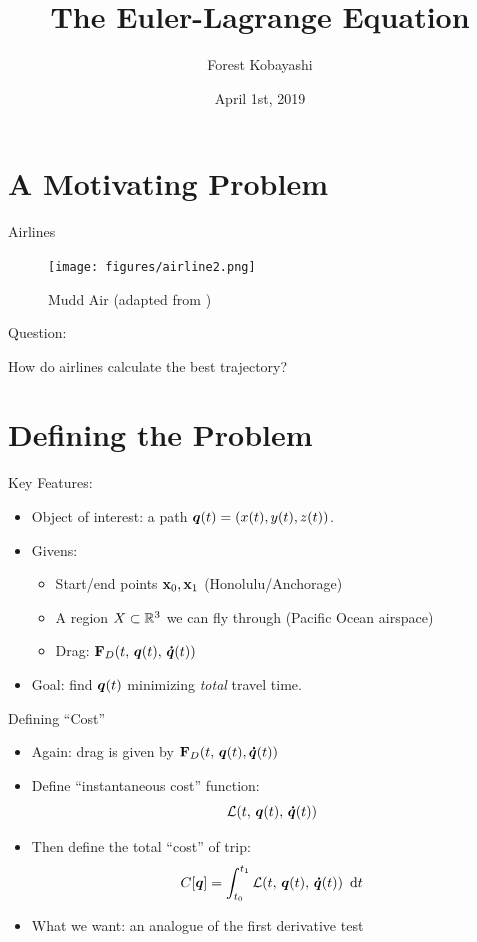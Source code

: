 \documentclass{fkpresentation}
\title{\textmd{The Euler-Lagrange Equation}}
\author{Forest Kobayashi}
\institute{Harvey Mudd College}
\date{April 1st, 2019}
\begin{document}
\frame{\titlepage}
\section{A Motivating Problem}

\begin{frame}{Airlines}
  \begin{figure}[h]
    \centering
    \texttt{[image: figures/airline2.png]}
    \caption{Mudd Air (adapted from \cite{Airplane})}
  \end{figure}
\end{frame}



\begin{frame}{Question:}
  \vfill
  \begin{center}
    \Huge
    How do airlines calculate the best trajectory?
  \end{center}
  \vfill
\end{frame}

\section{Defining the Problem}

\begin{frame}{Key Features:}
  \begin{itemize}
    \item Object of interest: a path $\bm q(t) = (x(t), y(t), z(t))$.
    \item Givens:
      \begin{itemize}
        \item Start/end points $\mathbf{x}_0, \mathbf{x}_1$ (Honolulu/Anchorage)
        \item A region $X \subset \mathbb{R}^3$ we can fly through (Pacific
          Ocean airspace)
        \item Drag: $\mathbf{F}_D(t,\, \bm q(t),\, \bm{\dot{q}}(t))$
      \end{itemize}
    \item Goal: find $\bm q(t)$ minimizing \emph{total} travel time.
  \end{itemize}
\end{frame}

\begin{frame}{Defining ``Cost''}
  \begin{itemize}
    \item Again: drag is given by $\mathbf{F}_D(t,\, \bm q(t),
      \bm{\dot{q}}(t))$
    \item Define ``instantaneous cost'' function:
      \[
        \mathcal{L}(t,\, \bm q(t),\, \bm{\dot q}(t))
      \]
    \item Then define the total ``cost'' of trip:
      \[
        C[\bm q] = \int_{t_0}^{t_1} \mathcal{L}(t,\, \bm q(t),\, \bm{\dot q}(t))
        \mathop{}\,\mathrm{d} t
      \]
    \item What we want: an analogue of the first derivative test
  \end{itemize}
\end{frame}
\end{document}
